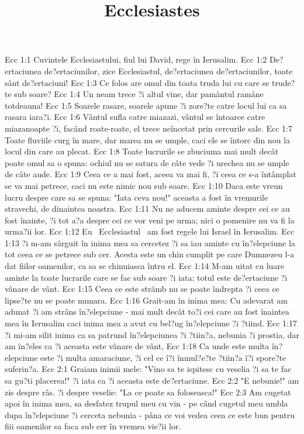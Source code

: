 

\title{Ecclesiastes}

Ecc 1:1  Cuvintele Ecclesiastului, fiul lui David, rege în Ierusalim.
Ecc 1:2  De?ertaciunea de?ertaciunilor, zice Ecclesiastul, de?ertaciunea de?ertaciunilor, toate sânt de?ertaciuni!
Ecc 1:3  Ce folos are omul din toata truda lui cu care se trude?te sub soare?
Ecc 1:4  Un neam trece ?i altul vine, dar pamântul ramâne totdeauna!
Ecc 1:5  Soarele rasare, soarele apune ?i zore?te catre locul lui ca sa rasara iara?i.
Ecc 1:6  Vântul sufla catre miazazi, vântul se întoarce catre miazanoapte ?i, facând roate-roate, el trece neîncetat prin cercurile sale.
Ecc 1:7  Toate fluviile curg în mare, dar marea nu se umple, caci ele se întorc din nou la locul din care au plecat.
Ecc 1:8  Toate lucrurile se zbuciuma mai mult decât poate omul sa o spuna: ochiul nu se satura de câte vede ?i urechea nu se umple de câte aude.
Ecc 1:9  Ceea ce a mai fost, aceea va mai fi, ?i ceea ce s-a întâmplat se va mai petrece, caci nu este nimic nou sub soare.
Ecc 1:10  Daca este vreun lucru despre care sa se spuna: "Iata ceva nou!" aceasta a fost în vremurile stravechi, de dinaintea noastra.
Ecc 1:11  Nu ne aducem aminte despre cei ce au fost înainte, ?i tot a?a despre cei ce vor veni pe urma; nici o pomenire nu va fi la urma?ii lor.
Ecc 1:12  Eu  Ecclesiastul  am fost regele lui Israel în Ierusalim.
Ecc 1:13  ?i m-am sârguit în inima mea sa cercetez ?i sa iau aminte cu în?elepciune la tot ceea ce se petrece sub cer. Acesta este un chin cumplit pe care Dumnezeu l-a dat fiilor oamenilor, ca sa se chinuiasca întru el.
Ecc 1:14  M-am uitat cu luare aminte la toate lucrarile care se fac sub soare ?i iata: totul este de?ertaciune ?i vânare de vânt.
Ecc 1:15  Ceea ce este strâmb nu se poate îndrepta ?i ceea ce lipse?te nu se poate numara.
Ecc 1:16  Grait-am în inima mea: Cu adevarat am adunat ?i am strâns în?elepciune - mai mult decât to?i cei care au fost înaintea mea în Ierusalim caci inima mea a avut cu bel?ug în?elepciune ?i ?tiind.
Ecc 1:17  ?i mi-am silit inima ca sa patrund în?elepciunea ?i ?tiin?a, nebunia ?i prostia, dar am în?eles ca ?i aceasta este vânare de vânt,
Ecc 1:18  Ca unde este multa în?elepciune este ?i multa amaraciune, ?i cel ce î?i înmul?e?te ?tiin?a î?i spore?te suferin?a.
Ecc 2:1  Graiam inimii mele: "Vino sa te ispitesc cu veselia ?i sa te fac sa gu?ti placerea!" ?i iata ca ?i aceasta este de?ertaciune.
Ecc 2:2  "E nebunie!" am zis despre râs. ?i despre veselie: "La ce poate sa foloseasca!"
Ecc 2:3  Am cugetat apoi în inima mea, sa desfatez trupul meu cu vin - pe când cugetul meu umbla dupa în?elepciune ?i cerceta nebunia - pâna ce voi vedea ceea ce este bun pentru fiii oamenilor sa faca sub cer în vremea vie?ii lor.
